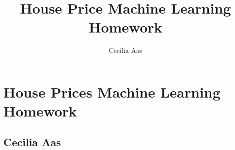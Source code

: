 \documentclass[11pt]{article} %
\title{House Price Machine Learning Homework}
\author{Cecilia Aas}
\begin{document}
\lstset{language=Python, frame=lines}

\section*{House Prices Machine Learning Homework}
\subsection*{Cecilia Aas}

\end{document}
